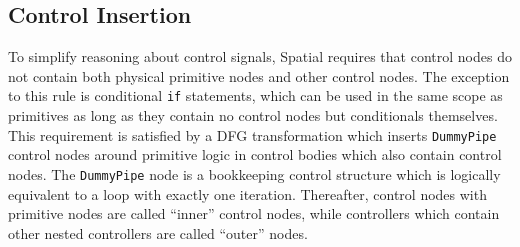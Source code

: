 {%



\subsection{Control Insertion}

To simplify reasoning about control signals, Spatial requires that control nodes do not contain both physical primitive nodes and other control nodes. The exception to this rule is conditional \texttt{\small{if}} statements, which can be used in the same scope as primitives as long as they contain no control nodes but conditionals themselves.
This requirement is satisfied by a DFG transformation which inserts \texttt{\small{DummyPipe}} control nodes around primitive logic in control bodies which also contain control nodes. The \texttt{\small{DummyPipe}} node is a bookkeeping control structure which is logically equivalent to a loop with exactly one iteration. 
Thereafter, control nodes with primitive nodes are called ``inner'' control nodes, while controllers which contain other nested controllers are called ``outer'' nodes.

}
